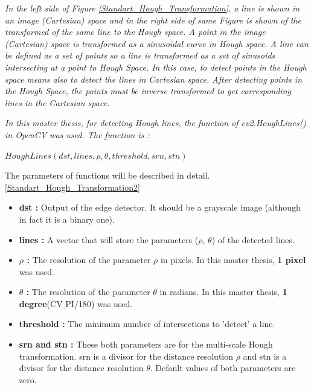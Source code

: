 \emph{\color{blue}In the left side of Figure \ref{Standart_Hough_Transformation}, a line is shown in an image (Cartesian) space and in the right side of same Figure is shown of the transformed of the same line to the Hough space. A point in the image (Cartesian) space is transformed as a sinusoidal curve in Hough space. A line can be defined as a set of points so a line is transformed as a set of sinusoids intersecting at a point to Hough Space. In this case, to detect points in the Hough space means also to detect the lines in Cartesian space. After detecting points in the Hough Space, the points must be inverse transformed to get corresponding lines in the Cartesian space.}

\emph{\color{blue}In this master thesis, for detecting Hough lines, the function of \textit{cv2.HoughLines()} in OpenCV was used. The function is :}

  \begin{center}
  
$HoughLines(dst, lines, \rho, \theta, threshold, srn, stn )  $

  \end{center}

The parameters of functions will be described in detail.\ref{Standart_Hough_Transformation2}
 
\begin{itemize}

\item \textbf{dst : }Output of the edge detector. It should be a grayscale image (although in fact it is a binary one).
 
\item \textbf{lines : }A vector that will store the parameters ($ \rho $, $ \theta $) of the detected lines.

\item \textbf{$ \rho $ : }The resolution of the parameter $ \rho $ in pixels. In this master thesis, \textbf{1 pixel} was used.

\item \textbf{$ \theta $ : }The resolution of the parameter $ \theta $ in radians. In this master thesis, \textbf{1 degree}(CV$ \_ $PI/180) was used.

\item \textbf{threshold : }The minimum number of intersections to 'detect' a line.

\item \textbf{srn and stn : }These both parameters are for the multi-scale Hough transformation. srn is a divisor for the distance resolution $ \rho $ and stn is a divisor for the distance resolution $ \theta $. Default values of both parameters are zero.

\end{itemize}

